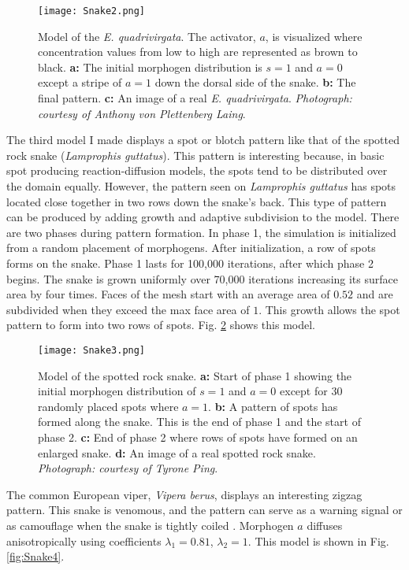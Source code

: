 \begin{figure}[ht]
	\centering
	\texttt{[image: Snake2.png]}
	\caption{Model of the \textit{E. quadrivirgata}. The activator, $a$, is visualized where concentration values from low to high are represented as brown to black. \textbf{a:} The initial morphogen distribution is $s=1$ and $a=0$ except a stripe of $a=1$ down the dorsal side of the snake. \textbf{b:} The final pattern. \textbf{c:} An image of a real \textit{E. quadrivirgata}. \textit{Photograph: courtesy of Anthony von Plettenberg Laing}.}
	\label{fig:Snake2}
\end{figure}

\newpage
The third model I made displays a spot or blotch pattern like that of the spotted rock snake (\textit{Lamprophis guttatus}). This pattern is interesting because, in basic spot producing reaction-diffusion models, the spots tend to be distributed over the domain equally. However, the pattern seen on \textit{Lamprophis guttatus} has spots located close together in two rows down the snake's back. This type of pattern can be produced by adding growth and adaptive subdivision to the model. There are two phases during pattern formation. In phase 1, the simulation is initialized from a random placement of morphogens. After initialization, a row of spots forms on the snake. Phase 1 lasts for 100,000 iterations, after which phase 2 begins. The snake is grown uniformly over 70,000 iterations increasing its surface area by four times. Faces of the mesh start with an average area of $0.52$ and are subdivided when they exceed the max face area of $1$. This growth allows the spot pattern to form into two rows of spots. Fig. \ref{fig:Snake3} shows this model.

\begin{figure}[ht]
	\centering
	\texttt{[image: Snake3.png]}
	\caption{Model of the spotted rock snake. \textbf{a:} Start of phase 1 showing the initial morphogen distribution of $s=1$ and $a=0$ except for 30 randomly placed spots where $a=1$. \textbf{b:} A pattern of spots has formed along the snake. This is the end of phase 1 and the start of phase 2. \textbf{c:} End of phase 2 where rows of spots have formed on an enlarged snake. \textbf{d:} An image of a real spotted rock snake. \textit{Photograph: courtesy of Tyrone Ping}.}
	\label{fig:Snake3}
\end{figure}

\newpage
The common European viper, \textit{Vipera berus}, displays an interesting zigzag pattern. This snake is venomous, and the pattern can serve as a warning signal or as camouflage when the snake is tightly coiled \citep{lillywhite2014}. Morphogen $a$ diffuses anisotropically using coefficients $\lambda_{1}=0.81$, $\lambda_{2}=1$. This model is shown in Fig. \ref{fig:Snake4}.

